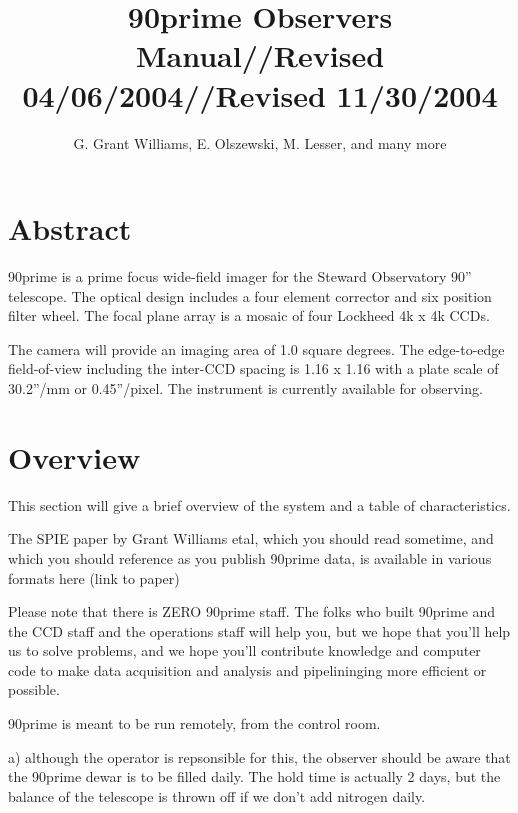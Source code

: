 \documentclass[letterpaper,12pt]{article}
\begin{document}
\title{90prime Observers Manual//Revised 04/06/2004//Revised 11/30/2004}
\author{G. Grant Williams, E. Olszewski, M. Lesser, and many more}
                                                                                
\maketitle

\section{Abstract}

90prime is a prime focus wide-field imager for the Steward Observatory 90''
telescope. The optical design includes a four element corrector and six
position filter wheel. The focal plane array is a mosaic of four Lockheed
4k x 4k CCDs.

The camera will provide an imaging area of 1.0 square degrees. The
edge-to-edge field-of-view including the inter-CCD spacing is
1.16 x 1.16 with a plate scale of 30.2''/mm or 0.45''/pixel. The
instrument is currently available for observing. 
                                                                                
\section{Overview}

This section will give a brief overview of the system and a table 
of characteristics.

The SPIE paper by Grant Williams etal, which you
should read sometime, and which you should reference
as you publish 90prime data, is available
in various formats here (link to paper)

Please note that there is ZERO 90prime staff. The folks
who built 90prime and the CCD staff and the operations staff
will help you, but we hope that you'll help us to
solve problems, and we hope you'll contribute
knowledge and computer code to make data acquisition
and analysis and pipelininging more efficient or possible.

90prime is meant to be run remotely, from the control room.

a) although the operator is repsonsible for this, the observer
should be aware that the 90prime dewar is to be filled daily.
The hold time is actually 2 days, but the balance of the
telescope is thrown off if we don't add nitrogen daily.
\end{document}
